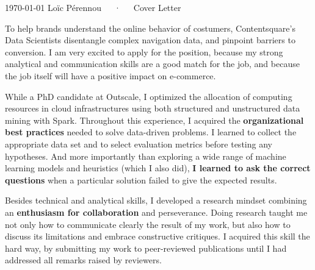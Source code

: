 \documentclass[11pt, a4paper]{awesome-cv}
\newcommand{\company}{Contentsquare}
\newcommand{\job}{Data Scientist}
\begin{document}
\makecvheader[R]

\makecvfooter
  {\today}
  {Loïc Pérennou~~~·~~~Cover Letter}
  {}

\makelettertitle

\begin{cvletter}
  To help brands understand the online behavior of costumers, \company's \job s disentangle complex navigation data, and pinpoint barriers to conversion. 
  I am very excited to apply for the position, because my strong analytical and communication skills are a good match for the job, and because the job itself will have a positive impact on e-commerce. 

  While a PhD candidate at Outscale, I optimized the allocation of computing resources in cloud infrastructures using both structured and unstructured data mining with Spark.  
Throughout this experience, I acquired the \textbf{organizational best practices} needed to solve data-driven problems.  
I learned to collect the appropriate data set and to select evaluation metrics before testing any hypotheses. 
And more importantly than exploring a wide range of machine learning models and heuristics (which I also did), \textbf{I learned to ask the correct questions} when a particular solution failed to give the expected results.  

Besides technical and analytical skills, I developed a research mindset combining an \textbf{enthusiasm for collaboration} and perseverance.  
Doing research taught me not only how to communicate clearly the result of my work, but also how to discuss its limitations and embrace constructive critiques.  
I acquired this skill the hard way, by submitting my work to peer-reviewed publications until I had addressed all remarks raised by reviewers. 


\end{cvletter}
\end{document}
